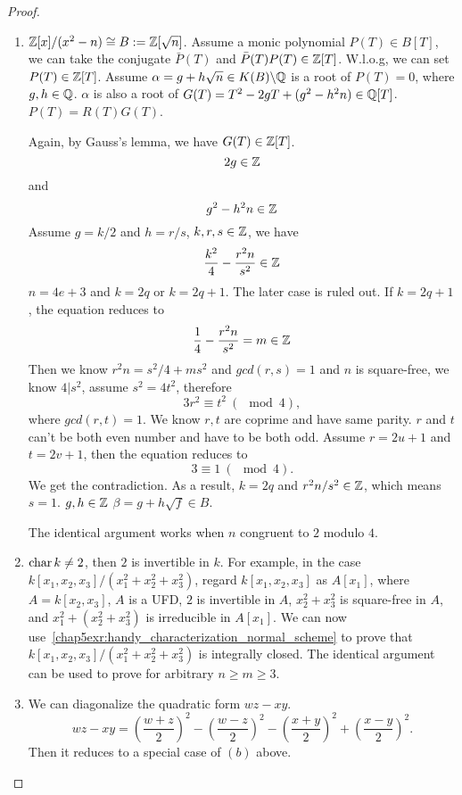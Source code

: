 \documentclass[11pt]{book} %
\begin{document}
\begin{proof}
\begin{enumerate}[label=(\alph*)]
\item $\mathbb Z[x]/(x^2-n)\cong B:=\mathbb Z[\sqrt{n}]$. Assume a monic polynomial $P(T)\in B[T]$, we can take the conjugate $\bar{P}(T)$ and $\bar{P}(T)P(T)\in \mathbb Z[T]$. W.l.o.g, we can set $P(T)\in \mathbb Z[T]$. Assume $\alpha=g+h\sqrt{n}\in K(B)\backslash \mathbb Q$ is a root of $P(T)=0$, where $g,h\in \mathbb Q$. $\alpha$ is also a root of $G(T)= T^2 - 2gT + (g^2 - h^2n) \in \mathbb Q[T]$. $P(T)=R(T)G(T)$.

Again, by Gauss's lemma, we have $G(T)\in \mathbb Z[T]$.
$$
2g\in \mathbb Z
$$
and
$$
g^2-h^2n\in \mathbb Z
$$
Assume $g=k/2$ and $h=r/s$, $k,r,s\in\mathbb Z$, we have
$$
\frac{k^2}{4}-\frac{r^2n}{s^2}\in \mathbb Z
$$
$n=4e+3$ and $k=2q$ or $k=2q+1$. The later case is ruled out. If $k=2q+1$,  the equation reduces to
$$
\frac{1}{4}-\frac{r^2n}{s^2}=m\in \mathbb Z
$$
Then we know $r^2 n=s^2/4 +ms^2$ and
$gcd(r,s)=1$ and $n$ is square-free, we know $4|s^2$, assume $s^2=4t^2$, therefore
$$
3r^2\equiv t^2\ (\mod 4), 
$$
where $gcd(r,t)=1$. We know $r,t$ are coprime and have same parity. $r$ and $t$ can't be both even number and have to be both odd. Assume $r=2u+1$ and $t=2v+1$, then the equation reduces to
$$
3\equiv 1\ (\mod 4).
$$
We get the contradiction. As a result, $k=2q$ and $r^2n/s^2\in\mathbb Z$, which means $s=1$. $g,h\in \mathbb Z$ $\beta=g+h\sqrt{f}\in B$.

The identical argument works when $n$ congruent to $2$ modulo $4$.

\item $\text{char\,} k\neq 2$, then $2$ is invertible in $k$. For example, in the case
$k[x_1,x_2,x_3]/(x_1^2+x_2^2+x_3^2)$, regard $k[x_1,x_2,x_3]$ as $A[x_1]$, where $A=k[x_2,x_3]$, $A$ is a UFD, $2$ is invertible in $A$, $x_2^2+x_3^2$ is square-free in $A$, and $x_1^2+(x_2^2+x_3^2)$ is irreducible in $A[x_1]$. We can now use~\ref{chap5exr:handy_characterization_normal_scheme} to prove that $k[x_1,x_2,x_3]/(x_1^2+x_2^2+x_3^2)$ is integrally closed. The identical argument can be used to prove for arbitrary $n\geq m\geq 3$.
\item We can diagonalize the quadratic form $wz-xy$.
$$
wz-xy=\left(\frac{w+z}{2}\right)^2-\left(\frac{w-z}{2}\right)^2-\left(\frac{x+y}{2}\right)^2+\left(\frac{x-y}{2}\right)^2.
$$
Then it reduces to a special case of $(b)$ above.

\end{enumerate}
\end{proof}
\end{document}
